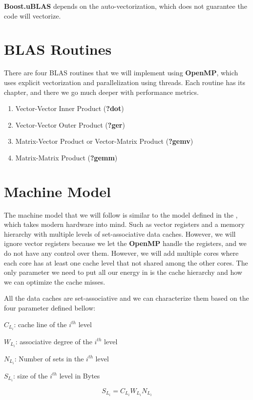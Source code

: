 \textbf{Boost.uBLAS} depends on the auto-vectorization, 
which does not guarantee the code will vectorize.

\section{BLAS Routines}

There are four BLAS routines that we will implement using \textbf{OpenMP}, 
which uses explicit vectorization and parallelization using threads. 
Each routine has its chapter, and there we go much deeper with performance metrics.

\begin{enumerate}
    \item Vector-Vector Inner Product (\textbf{?dot})
    \item Vector-Vector Outer Product (\textbf{?ger})
    \item Matrix-Vector Product or Vector-Matrix Product (\textbf{?gemv})
    \item Matrix-Matrix Product (\textbf{?gemm})
\end{enumerate}

\section{Machine Model}

The machine model that we will follow is similar to the model defined in the 
\citep{BLIS}, which takes modern hardware into mind. Such as vector registers 
and a memory hierarchy with multiple levels of set-associative data caches. 
However, we will ignore vector registers because we let the \textbf{OpenMP} handle 
the registers, and we do not have any control over them. However, 
we will add multiple cores where each core has at least one cache level 
that not shared among the other cores.
The only parameter we need to put all our energy in is the cache hierarchy and 
how we can optimize the cache misses.

All the data caches are set-associative and we can characterize them based 
on the four parameter defined bellow:

\(C_{L_i}\): cache line of the \(i^{th}\) level

\(W_{L_i}\): associative degree of the \(i^{th}\) level

\(N_{L_i}\): Number of sets in the \(i^{th}\) level

\(S_{L_i}\): size of the \(i^{th}\) level in Bytes

\begin{equation}
    S_{L_i} = C_{L_i}W_{L_i}N_{L_i}
    \label{equ:cache_size}
\end{equation}


